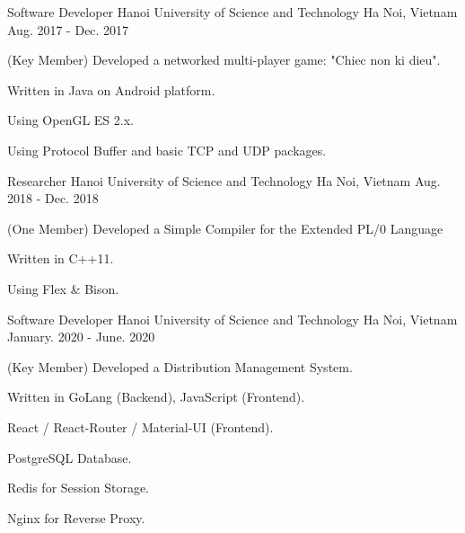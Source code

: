 


\begin{cventries}


\cventry
{Software Developer} %
{Hanoi University of Science and Technology} %
{Ha Noi, Vietnam} %
{Aug. 2017 - Dec. 2017} %
{ %
\begin{cvitems}
\item{(Key Member) Developed a networked multi-player game: "Chiec non ki dieu".}
\item{Written in Java on Android platform.}
\item{Using OpenGL ES 2.x.}
\item{Using Protocol Buffer and basic TCP and UDP packages.}
\end{cvitems}
}


\cventry
{Researcher} %
{Hanoi University of Science and Technology} %
{Ha Noi, Vietnam} %
{Aug. 2018 - Dec. 2018} %
{ %
\begin{cvitems}
\item{(One Member) Developed a Simple Compiler for the Extended PL/0 Language}
\item{Written in C++11.}
\item{Using Flex \& Bison.}
\end{cvitems}
}


\cventry
{Software Developer} %
{Hanoi University of Science and Technology} %
{Ha Noi, Vietnam} %
{January. 2020 - June. 2020} %
{ %
\begin{cvitems}
\item{(Key Member) Developed a Distribution Management System.}
\item{Written in GoLang (Backend), JavaScript (Frontend).}
\item{React / React-Router / Material-UI (Frontend).}
\item{PostgreSQL Database.}
\item{Redis for Session Storage.}
\item{Nginx for Reverse Proxy.}
\end{cvitems}
}


\end{cventries}
